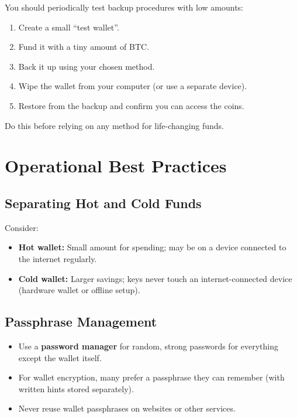 \documentclass[12pt,a4paper]{book}
\begin{document}
You should periodically test backup procedures with low amounts:

\begin{enumerate}
  \item Create a small \enquote{test wallet}.
  \item Fund it with a tiny amount of BTC.
  \item Back it up using your chosen method.
  \item Wipe the wallet from your computer (or use a separate device).
  \item Restore from the backup and confirm you can access the coins.
\end{enumerate}

Do this before relying on any method for life-changing funds.

\chapter{Operational Best Practices}

\section{Separating Hot and Cold Funds}

Consider:

\begin{itemize}
  \item \textbf{Hot wallet:} Small amount for spending; may be on a device connected to the internet regularly.
  \item \textbf{Cold wallet:} Larger savings; keys never touch an internet-connected device (hardware wallet or offline setup).
\end{itemize}

\section{Passphrase Management}

\begin{itemize}
  \item Use a \textbf{password manager} for random, strong passwords for everything except the wallet itself.
  \item For wallet encryption, many prefer a passphrase they can remember (with written hints stored separately).
  \item Never reuse wallet passphrases on websites or other services.
\end{itemize}
\end{document}
